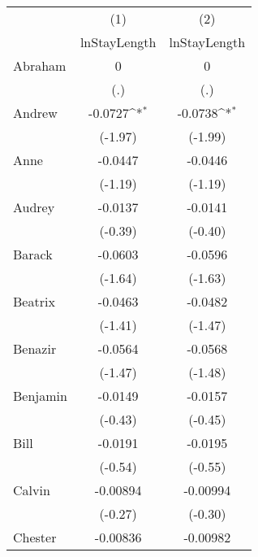 {
\def\sym#1{\ifmmode^{#1}\else\(^{#1}\)\fi}
\begin{tabular}{l*{2}{c}}
\hline\hline
                    &\multicolumn{1}{c}{(1)}&\multicolumn{1}{c}{(2)}\\
                    &\multicolumn{1}{c}{lnStayLength}&\multicolumn{1}{c}{lnStayLength}\\
\hline
Abraham             &           0         &           0         \\
                    &         (.)         &         (.)         \\
[1em]
Andrew              &     -0.0727\sym{*}  &     -0.0738\sym{*}  \\
                    &     (-1.97)         &     (-1.99)         \\
[1em]
Anne                &     -0.0447         &     -0.0446         \\
                    &     (-1.19)         &     (-1.19)         \\
[1em]
Audrey              &     -0.0137         &     -0.0141         \\
                    &     (-0.39)         &     (-0.40)         \\
[1em]
Barack              &     -0.0603         &     -0.0596         \\
                    &     (-1.64)         &     (-1.63)         \\
[1em]
Beatrix             &     -0.0463         &     -0.0482         \\
                    &     (-1.41)         &     (-1.47)         \\
[1em]
Benazir             &     -0.0564         &     -0.0568         \\
                    &     (-1.47)         &     (-1.48)         \\
[1em]
Benjamin            &     -0.0149         &     -0.0157         \\
                    &     (-0.43)         &     (-0.45)         \\
[1em]
Bill                &     -0.0191         &     -0.0195         \\
                    &     (-0.54)         &     (-0.55)         \\
[1em]
Calvin              &    -0.00894         &    -0.00994         \\
                    &     (-0.27)         &     (-0.30)         \\
[1em]
Chester             &    -0.00836         &    -0.00982         \\

\end{tabular}}
